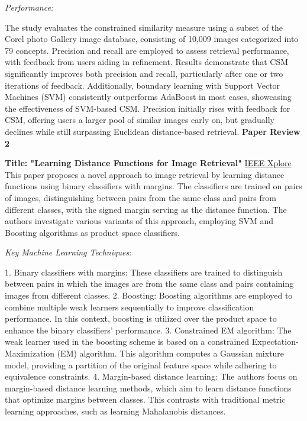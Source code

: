 \documentclass[a4paper]{article}
\theoremstyle{plain}
\theoremstyle{definition}
\begin{document}
{\noindent \textit {Performance:}
\newline

The study evaluates the constrained similarity measure using a subset of the Corel photo Gallery
image database, consisting of 10,009 images categorized into 79 concepts. Precision and recall
are employed to assess retrieval performance, with feedback from users aiding in refinement.
Results demonstrate that CSM significantly improves both precision and recall, particularly after
one or two iterations of feedback. Additionally, boundary learning with Support Vector Machines
(SVM) consistently outperforms AdaBoost in most cases, showcasing the effectiveness of SVM-based
CSM. Precision initially rises with feedback for CSM, offering users a larger pool of similar
images early on, but gradually declines while still surpassing Euclidean distance-based
retrieval.
\newline
\newpage
\noindent\textbf{\cite{hertz2004learning} Paper Review 2} \newline
        
\noindent\textbf{Title: "Learning Distance Functions for Image Retrieval"}
\newline
\href {https://ieeexplore.ieee.org/stamp/stamp.jsp?tp=&arnumber=1315215&tag=1}{IEEE Xplore} \newline
This paper proposes a novel approach to image retrieval by learning distance functions using binary classifiers with margins. The classifiers are trained on pairs of images, distinguishing between pairs from the same class and pairs from different classes, with the signed margin serving as the distance function. The authors investigate various variants of this approach,
employing SVM and Boosting algorithms as product space classifiers. \newline

\noindent \textit {Key Machine Learning Techniques}:
\newline

1. Binary classifiers with margins: These classifiers are trained to distinguish between pairs in
which the images are from the same class and pairs containing images from different classes.
2. Boosting: Boosting algorithms are employed to combine multiple weak learners sequentially to
improve classification performance. In this context, boosting is utilized over the product
space to enhance the binary classifiers' performance.
3. Constrained EM algorithm: The weak learner used in the boosting scheme is based on a constrained Expectation-Maximization (EM) algorithm. This algorithm computes a Gaussian mixture model, providing a partition of the original feature space while adhering to equivalence constraints.
4. Margin-based distance learning: The authors focus on margin-based distance learning methods, which aim to learn distance functions that optimize margins between classes. This contrasts with traditional metric learning approaches, such as learning Mahalanobis distances.\newline

}
\end{document}
